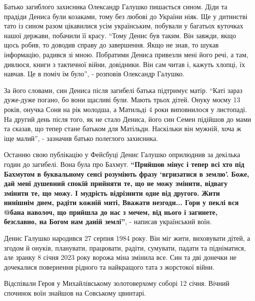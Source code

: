 
Батько загиблого захисника Олександр Галушко пишається сином. Діди та прадіди
Дениса були козаками, тому без любові до України ніяк. Ще у дитинстві тато із
сином разом цікавилися усім українським, побували у багатьох куточках нашої
держави, побачили її красу. \enquote{Тому Денис був таким. Він завжди, якщо
щось робив, то доводив справу до завершення. Якщо не знав, то шукав інформацію,
радився зі мною. Побратими Дениса привезли мені його речі, а там, дивлюся,
книги з тактичної війни, довідники. Він сам читав і, кажуть хлопці, їх навчав.
Це в поміч їм було}, - розповів Олександр Галушко.

За його словами, син Дениса після загибелі батька підтримує матір.
\enquote{Каті зараз дуже-дуже погано, бо вони щасливі були. Мають трьох дітей.
Онуку моєму 13 років, онучка Соня на рік молодша, а Матильді 4 роки виповнилося
у листопаді.  На другий день після того, як не стало Дениса, його син Семен
підійшов до мами та сказав, що тепер стане батьком для Матільди. Наскільки він
мужній, хоча ж іще малий}, - зазначив батько полеглого захисника.

Останню свою публікацію у Фейсбуці Денис Галушко оприлюднив за декілька годин
до загибелі. Вона була про Бахмут. {\bfseries\enquote{Прийшов мінус і тепер всі хто під
Бахмутом в буквальному сенсі розуміють фразу \enquote{вгризатися в землю}.
Боже, дай мені душевний спокій прийняти те, що не можу змінити, відвагу змінити
те, що можу. І мудрість відрізнити одне від другого. Жити нинішнім днем, радіти
кожній миті, Вважати незгоди... Гори у пеклі вся @бана наволоч, що прийшла до
нас з мечем, від нього і загинете, безславно, на Богом нам даній землі}}, -
написав український воїн.

Денис Галушко народився 27 серпня 1984 року. Він міг жити, виховувати дітей, а
згодом й онуків, планувати, працювати, радіти, сумувати, падати та підніматися,
але зранку 8 січня 2023 року ворожа міна змінила все. Син та дві донечки не
дочекалися повернення рідного та найкращого тата з жорстокої війни.


Відспівали Героя у Михайлівському золотоверхому соборі 12 січня. Вічний
спочинок воїн знайшов на Совському цвинтарі.
